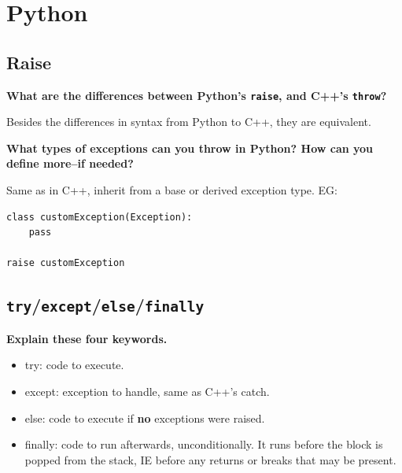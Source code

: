 \documentclass[12pt, letterpaper]{article}
\newcommand{\question}[1]{\textbf{#1}\par}
\newenvironment{answerblock}{\color{Green4}}{\normalcolor\vspace{1em}}
\begin{document}
\pagebreak
\section{Python}

\subsection{Raise}

\question{What are the differences between Python's \texttt{raise}, and C++'s
\newline\texttt{throw}?}

\begin{answerblock}
Besides the differences in syntax from Python to C++, they are equivalent.
\end{answerblock}

\question{What types of exceptions can you throw in Python? How can you define
more--if needed?}

\begin{answerblock}
Same as in C++, inherit from a base or derived exception type. EG:

\begin{verbatim}
class customException(Exception):
    pass

raise customException
\end{verbatim}
\end{answerblock}

\subsection{\texttt{try}/\texttt{except}/\texttt{else}/\texttt{finally}}

\question{Explain these four keywords.}

\begin{answerblock}
\begin{itemize}
    \item try: code to execute.
    \item except: exception to handle, same as C++'s catch.
    \item else: code to execute if \textbf{no} exceptions were raised.
    \item finally: code to run afterwards, unconditionally. It runs before the
    block is popped from the stack, IE before any returns or breaks that may
    be present.
\end{itemize}
\end{answerblock}
\end{document}
